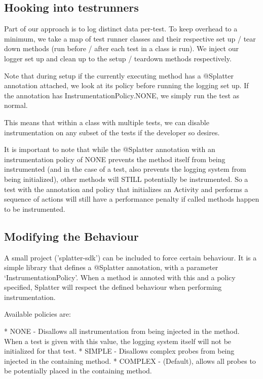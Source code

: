 \subsection{Hooking into testrunners}

Part of our approach is to log distinct data per-test. To keep overhead to a minimum, we take a map of test runner classes and their respective set up / tear down methods (run before / after each test in a class is run). We inject our logger set up and clean up to the setup / teardown methods respectively.

Note that during setup if the currently executing method has a @Splatter annotation attached, we look at its policy before running the logging set up. If the annotation has InstrumentationPolicy.NONE, we simply run the test as normal.

This means that within a class with multiple tests, we can disable instrumentation on any subset of the tests if the developer so desires.

It is important to note that while the @Splatter annotation with an instrumentation policy of NONE prevents the method itself from being instrumented (and in the case of a test, also prevents the logging system from being initialized), other methods will STILL potentially be instrumented. So a test with the annotation and policy that initializes an Activity and performs a sequence of actions will still have a performance penalty if called methods happen to be instrumented.

\subsection{Modifying the Behaviour}

A small project ('splatter-sdk') can be included to force certain behaviour. It is a simple library that defines a @Splatter annotation, with a parameter {\lq}InstrumentationPolicy{\rq}. When a method is annoted with this and a policy specified, Splatter will respect the defined behaviour when performing instrumentation.

Available policies are:

* NONE - Disallows all instrumentation from being injected in the method. When a test is given with this value, the logging system itself will not be initialized for that test.
* SIMPLE - Disallows complex probes from being injected in the containing method.
* COMPLEX - (Default), allows all probes to be potentially placed in the containing method.

